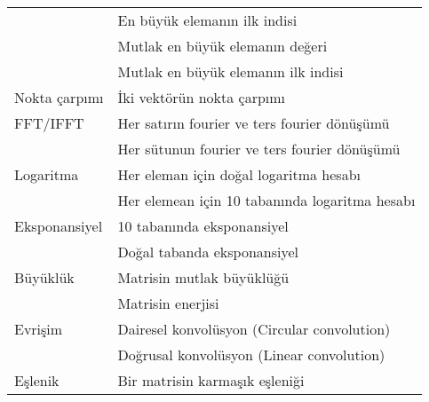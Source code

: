 \begin{longtable}{p{80pt} p{250pt}}
 												& En büyük elemanın ilk indisi																\\%
 												& Mutlak en büyük elemanın değeri															\\%
 												& Mutlak en büyük elemanın ilk indisi													\\%
 Nokta çarpımı					& İki vektörün nokta çarpımı																	\\%
 FFT/IFFT								& Her satırın fourier ve ters fourier dönüşümü								\\%
 												& Her sütunun fourier ve ters fourier dönüşümü								\\%
 Logaritma							& Her eleman için doğal logaritma hesabı											\\%
 												& Her elemean için 10 tabanında logaritma hesabı							\\%
 Eksponansiyel					& 10 tabanında eksponansiyel 																	\\%
 												& Doğal tabanda eksponansiyel 																\\%
 Büyüklük								& Matrisin mutlak büyüklüğü																		\\%
 												& Matrisin enerjisi																						\\%
 Evrişim 								& Dairesel konvolüsyon (Circular convolution)									\\%
 												& Doğrusal konvolüsyon (Linear convolution) 									\\%
 Eşlenik     						&	Bir matrisin karmaşık eşleniği															\\%

\end{longtable}
